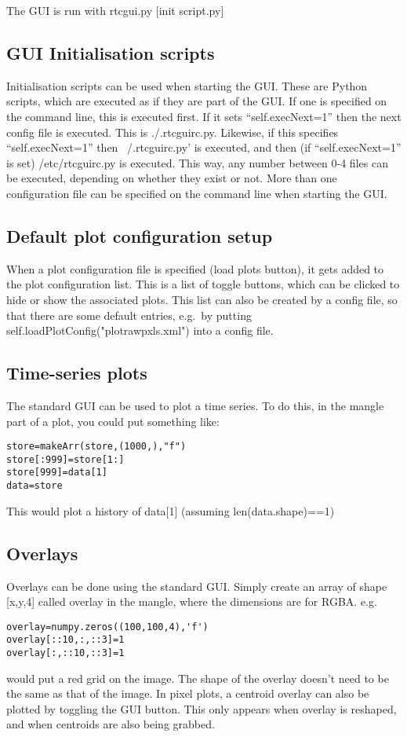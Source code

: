 \documentclass[a4,10pt]{article}
\begin{document}
The GUI is run with rtcgui.py [init script.py]

\subsection{GUI Initialisation scripts}
Initialisation scripts can be used when starting the GUI.  These are
Python scripts, which are executed as if they are part of the GUI.  If
one is specified on the command line, this is executed first.  If it
sets ``self.execNext=1'' then the next config file is executed.  This
is ./.rtcguirc.py.  Likewise, if this specifies ``self.execNext=1''
then ~/.rtcguirc.py' is executed, and then (if ``self.execNext=1'' is
set) /etc/rtcguirc.py is executed.  This way, any number between 0-4
files can be executed, depending on whether they exist or not.  More
than one configuration file can be specified on the command line when
starting the GUI.

\subsection{Default plot configuration setup}
When a plot configuration file is specified (load plots button), it
gets added to the plot configuration list.  This is a list of toggle
buttons, which can be clicked to hide or show the associated plots.
This list can also be created by a config file, so that there are some
default entries, e.g.\ by putting
self.loadPlotConfig("plotrawpxls.xml") into a config file.

\subsection{Time-series plots}
The standard GUI can be used to plot a time series.
To do this, in the mangle part of a plot, you could put something
like:
\begin{verbatim}
store=makeArr(store,(1000,),"f")
store[:999]=store[1:]
store[999]=data[1]
data=store
\end{verbatim}
This would plot a history of data[1] (assuming len(data.shape)==1)

\subsection{Overlays}
Overlays can be done using the standard GUI.
Simply create an array of shape [x,y,4] called overlay in the mangle,
where the dimensions are for RGBA.  
e.g.
\begin{verbatim}
overlay=numpy.zeros((100,100,4),'f')
overlay[::10,:,::3]=1
overlay[:,::10,::3]=1
\end{verbatim}
would put a red grid on the image.  The shape of the overlay doesn't
need to be the same as that of the image.
In pixel plots, a centroid overlay can also be plotted by toggling the
GUI button.  This only appears when overlay is reshaped, and when
centroids are also being grabbed.
\end{document}
